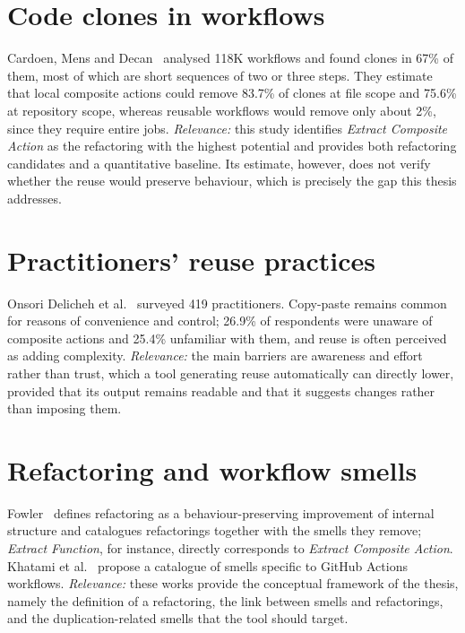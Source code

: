 \documentclass[a4paper,11pt,notitlepage]{report}
\begin{document}
\section{Code clones in workflows} \label{sec_clones}

Cardoen, Mens and Decan~\cite{Cardoen2026} analysed 118K workflows and found clones in
67\% of them, most of which are short sequences of two or three steps. They estimate that
local composite actions could remove 83.7\% of clones at file scope and 75.6\% at
repository scope, whereas reusable workflows would remove only about 2\%, since they
require entire jobs.
\emph{Relevance:} this study identifies \emph{Extract Composite Action} as the refactoring
with the highest potential and provides both refactoring candidates and a quantitative
baseline. Its estimate, however, does not verify whether the reuse would preserve
behaviour, which is precisely the gap this thesis addresses.

\section{Practitioners' reuse practices} \label{sec_practices}

Onsori Delicheh et al.~\cite{OnsoriDelicheh2026} surveyed 419 practitioners. Copy-paste
remains common for reasons of convenience and control; 26.9\% of respondents were unaware
of composite actions and 25.4\% unfamiliar with them, and reuse is often perceived as
adding complexity.
\emph{Relevance:} the main barriers are awareness and effort rather than trust, which a
tool generating reuse automatically can directly lower, provided that its output remains
readable and that it suggests changes rather than imposing them.

\section{Refactoring and workflow smells} \label{sec_smells}

Fowler~\cite{Fowler2018} defines refactoring as a behaviour-preserving improvement of
internal structure and catalogues refactorings together with the smells they remove;
\emph{Extract Function}, for instance, directly corresponds to \emph{Extract Composite
Action}. Khatami et al.~\cite{Khatami2024} propose a catalogue of smells specific to
GitHub Actions workflows.
\emph{Relevance:} these works provide the conceptual framework of the thesis, namely the
definition of a refactoring, the link between smells and refactorings, and the
duplication-related smells that the tool should target.
\end{document}
